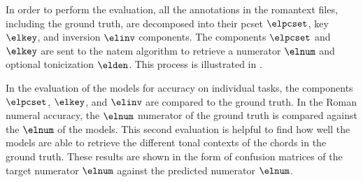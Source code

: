 
In order to perform the evaluation, all the annotations in
the \gls{romantext} files, including the ground truth, are
decomposed into their \gls{pcset} $\elpcset$, key $\elkey$,
and inversion $\elinv$ components. The components $\elpcset$
and $\elkey$ are sent to the \gls{natem} algorithm to
retrieve a numerator $\elnum$ and optional tonicization
$\elden$. This process is illustrated in
.


In the evaluation of the models for accuracy on individual
tasks, the components $\elpcset$, $\elkey$, and $\elinv$ are
compared to the ground truth. In the Roman numeral accuracy,
the $\elnum$ numerator of the ground truth is compared
against the $\elnum$ of the models. This second evaluation
is helpful to find how well the models are able to retrieve
the different tonal contexts of the chords in the ground
truth. These results are shown in the form of confusion
matrices of the target numerator $\elnum$ against the
predicted numerator $\elnum$.


